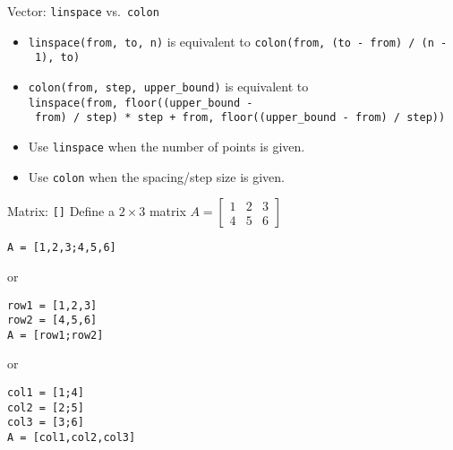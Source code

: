 \begin{frame}[fragile]{Vector: \texttt{linspace} vs.~\texttt{colon}}
\protect\hypertarget{vector-linspace-vs.-colon-1}{}
\begin{itemize}[<+->]
\tightlist
\item
  \texttt{linspace(from,\ to,\ n)} is equivalent to
  \texttt{colon(from,\ (to\ -\ from)\ /\ (n\ -\ 1),\ to)}
\item
  \texttt{colon(from,\ step,\ upper\_bound)} is equivalent to
  \texttt{linspace(from,\ floor((upper\_bound\ -\ from)\ /\ step)\ *\ step\ +\ from,\ floor((upper\_bound\ -\ from)\ /\ step))}
\item
  Use \texttt{linspace} when the number of points is given.
\item
  Use \texttt{colon} when the spacing/step size is given.
\end{itemize}
\end{frame}

\begin{frame}[fragile]{Matrix: \texttt{{[}{]}}}
\protect\hypertarget{matrix}{}
Define a \(2 \times 3\) matrix
\(A = \begin{bmatrix} 1 & 2 & 3 \\ 4 & 5 & 6 \end{bmatrix}\)

\begin{verbatim}
A = [1,2,3;4,5,6]
\end{verbatim}

or

\begin{verbatim}
row1 = [1,2,3]
row2 = [4,5,6]
A = [row1;row2]
\end{verbatim}

or

\begin{verbatim}
col1 = [1;4]
col2 = [2;5]
col3 = [3;6]
A = [col1,col2,col3]
\end{verbatim}
\end{frame}

